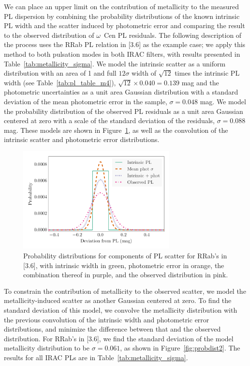 We can place an upper limit on the contribution of metallicity to the measured PL dispersion by combining the probability distributions of the known intrinsic PL width and the scatter induced by photometric error and comparing the result to the observed distribution of $\omega$~Cen PL residuals. The following description of the process uses the RRab PL relation in [3.6] as the example case; we apply this method to both pulsation modes in both IRAC filters, with results presented in Table~\ref{tab:metallicity_sigma}. We model the intrinsic scatter as a uniform distribution with an area of 1 and full $12\sigma$ width of $\sqrt{12}$ times the intrinsic PL width (see Table~\ref{tab:pl_table_m4}), $\sqrt{12} \times 0.040 = 0.139$ mag and the photometric uncertainties as a unit area Gaussian distribution with a standard deviation of the mean photometric error in the sample, $\sigma = 0.048$ mag. We model the probability distribution of the observed PL residuals as a unit area Gaussian centered at zero with a scale of the standard deviation of the residuals, $\sigma = 0.088$ mag. These models are shown in Figure~\ref{fig:probdist1}, as well as the convolution of the intrinsic scatter and photometric error distributions.

\begin{figure}
\begin{center}
\includegraphics[width=80mm]{reworked_fitting_code/final_plots/distributions_nofeh_ab_3_gaussian.pdf}
\caption{Probability distributions for components of PL scatter for RRab's in [3.6], with intrinsic width in green, photometric error in orange, the combination thereof in purple, and the observed distribution in pink.}
\label{fig:probdist1}
\end{center}
\end{figure}

To constrain the contribution of metallicity to the observed scatter, we model the metallicity-induced scatter as another Gaussian centered at zero. To find the standard deviation of this model, we convolve the metallicity distribution with the previous convolution of the intrinsic width and photometric error distributions, and minimize the difference between that and the observed distribution. For RRab's in [3.6], we find the standard deviation of the model metallicity distribution to be $\sigma = 0.061$, as shown in Figure~\ref{fig:probdist2}. The results for all IRAC PLs are in Table~\ref{tab:metallicity_sigma}.

